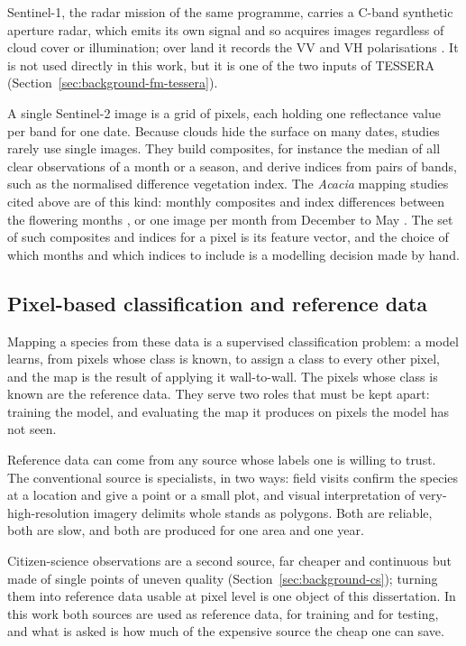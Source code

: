 Sentinel-1, the radar mission of the same programme, carries a C-band
synthetic aperture radar, which emits its own signal and so acquires
images regardless of cloud cover or illumination; over land it records
the VV and VH polarisations \cite{esa-s1mission}. It is not used
directly in this work, but it is one of the two inputs of TESSERA
(Section~\ref{sec:background-fm-tessera}).

A single Sentinel-2 image is a grid of pixels, each holding one
reflectance value per band for one date. Because clouds hide the
surface on many dates, studies rarely use single images. They build
composites, for instance the median of all clear observations of a
month or a season, and derive indices from pairs of bands, such as the
normalised difference vegetation index. The \emph{Acacia} mapping
studies cited above are of this kind: monthly composites and index
differences between the flowering months \cite{domingo2023}, or one
image per month from December to May \cite{mouta2021}. The set of such
composites and indices for a pixel is its feature vector, and the
choice of which months and which indices to include is a modelling
decision made by hand.

\subsection{Pixel-based classification and reference data}
\label{sec:background-eo-classification}

Mapping a species from these data is a supervised classification
problem: a model learns, from pixels whose class is known, to assign a
class to every other pixel, and the map is the result of applying it
wall-to-wall. The pixels whose class is known are the reference data.
They serve two roles that must be kept apart: training the model, and
evaluating the map it produces on pixels the model has not seen.

Reference data can come from any source whose labels one is willing to trust. The conventional source is specialists, in two ways: field visits confirm the species at a location and give a point or a small plot, and visual interpretation of very-high-resolution imagery delimits whole stands as polygons. Both are reliable, both are slow,
and both are produced for one area and one year.

Citizen-science observations are a second source, far cheaper and
continuous but made of single points of uneven quality
(Section~\ref{sec:background-cs}); turning them into reference data
usable at pixel level is one object of this dissertation. In this work both sources are
used as reference data, for training and for testing, and what is
asked is how much of the expensive source the cheap one can save.

